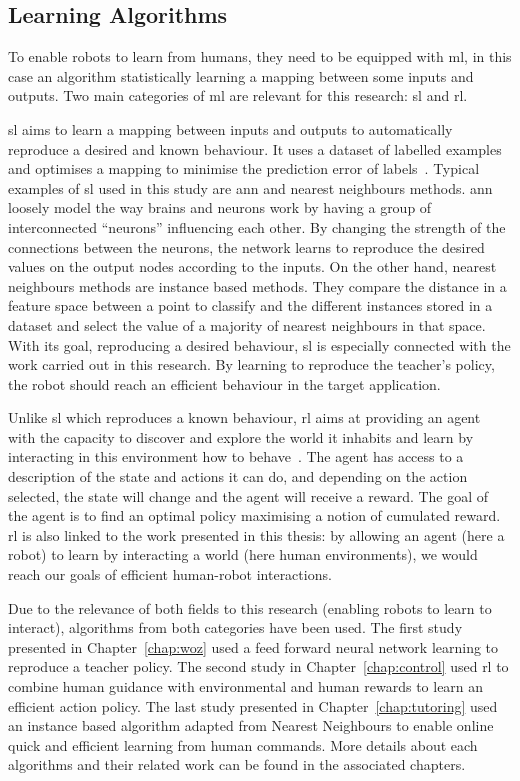 \subsection{Learning Algorithms}
To enable robots to learn from humans, they need to be equipped with \acrfull{ml}, in this case an algorithm statistically learning a mapping between some inputs and outputs. Two main categories of \gls{ml} are relevant for this research: \gls{sl} and \gls{rl}.

\gls{sl} aims to learn a mapping between inputs and outputs to automatically reproduce a desired and known behaviour. It uses a dataset of labelled examples and optimises a mapping to minimise the prediction error of labels~\citep{russell2016artificial}. Typical examples of \gls{sl} used in this study are \gls{ann} and nearest neighbours methods. \gls{ann} loosely model the way brains and neurons work by having a group of interconnected ``neurons'' influencing each other. By changing the strength of the connections between the neurons, the network learns to reproduce the desired values on the output nodes according to the inputs. On the other hand, nearest neighbours methods are instance based methods. They compare the distance in a feature space between a point to classify and the different instances stored in a dataset and select the value of a majority of nearest neighbours in that space. With its goal, reproducing a desired behaviour, \gls{sl} is especially connected with the work carried out in this research. By learning to reproduce the teacher's policy, the robot should reach an efficient behaviour in the target application.

Unlike \gls{sl} which reproduces a known behaviour, \gls{rl} aims at providing an agent with the capacity to discover and explore the world it inhabits and learn by interacting in this environment how to behave~\citep{sutton1998reinforcement}. The agent has access to a description of the state and actions it can do, and depending on the action selected, the state will change and the agent will receive a reward. The goal of the agent is to find an optimal policy maximising a notion of cumulated reward. \gls{rl} is also linked to the work presented in this thesis: by allowing an agent (here a robot) to learn by interacting a world (here human environments), we would reach our goals of efficient human-robot interactions.

Due to the relevance of both fields to this research (enabling robots to learn to interact), algorithms from both categories have been used. The first study presented in Chapter~\ref{chap:woz} used a feed forward neural network learning to reproduce a teacher policy. The second study in Chapter~\ref{chap:control} used \gls{rl} to combine human guidance with environmental and human rewards to learn an efficient action policy. The last study presented in Chapter~\ref{chap:tutoring} used an instance based algorithm adapted from Nearest Neighbours to enable online quick and efficient learning from human commands. More details about each algorithms and their related work can be found in the associated chapters.

